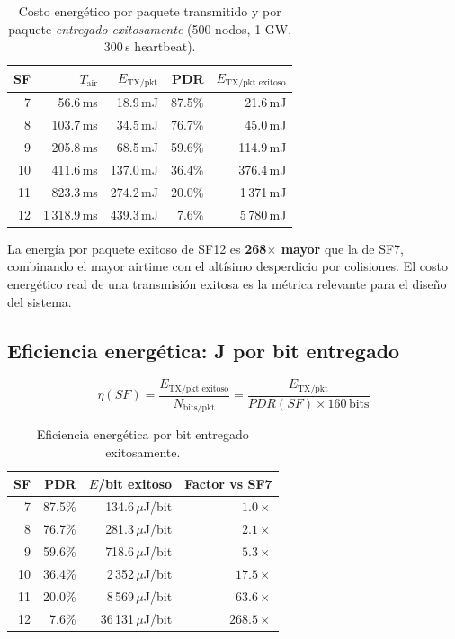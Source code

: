 \documentclass[12pt,letterpaper]{article}
\begin{document}
\begin{table}[H]
\centering
\caption{Costo energético por paquete transmitido y por paquete
  \emph{entregado exitosamente} (500 nodos, 1 GW, 300\,s heartbeat).}
\label{tab:energy_per_pkt}
\begin{tabular}{rrrrr}
\toprule
\textbf{SF} & \textbf{$T_\text{air}$} & \textbf{$E_\text{TX/pkt}$} &
  \textbf{PDR} & \textbf{$E_\text{TX/pkt exitoso}$} \\
\midrule
 7 &    56.6\,ms &  18.9\,mJ &  87.5\% &  21.6\,mJ \\
 8 &   103.7\,ms &  34.5\,mJ &  76.7\% &  45.0\,mJ \\
 9 &   205.8\,ms &  68.5\,mJ &  59.6\% & 114.9\,mJ \\
10 &   411.6\,ms & 137.0\,mJ &  36.4\% & 376.4\,mJ \\
11 &   823.3\,ms & 274.2\,mJ &  20.0\% & 1\,371\,mJ \\
12 & 1\,318.9\,ms & 439.3\,mJ &   7.6\% & 5\,780\,mJ \\
\bottomrule
\end{tabular}
\end{table}

La energía por paquete exitoso de SF12 es \textbf{268$\times$ mayor} que
la de SF7, combinando el mayor airtime con el altísimo desperdicio por
colisiones. El costo energético real de una transmisión exitosa es la
métrica relevante para el diseño del sistema.

\subsection{Eficiencia energética: J por bit entregado}

\begin{equation}
  \eta(SF) = \frac{E_\text{TX/pkt exitoso}}{N_\text{bits/pkt}}
           = \frac{E_\text{TX/pkt}}{PDR(SF) \times 160\,\text{bits}}
\end{equation}

\begin{table}[H]
\centering
\caption{Eficiencia energética por bit entregado exitosamente.}
\label{tab:energy_per_bit}
\begin{tabular}{rrrr}
\toprule
\textbf{SF} & \textbf{PDR} & \textbf{$E$/bit exitoso} &
  \textbf{Factor vs SF7} \\
\midrule
 7 &  87.5\% &  134.6\,$\mu$J/bit & $1.0\times$ \\
 8 &  76.7\% &  281.3\,$\mu$J/bit & $2.1\times$ \\
 9 &  59.6\% &  718.6\,$\mu$J/bit & $5.3\times$ \\
10 &  36.4\% & 2\,352\,$\mu$J/bit & $17.5\times$ \\
11 &  20.0\% & 8\,569\,$\mu$J/bit & $63.6\times$ \\
12 &   7.6\% & 36\,131\,$\mu$J/bit & $268.5\times$ \\
\bottomrule
\end{tabular}
\end{table}
\end{document}

